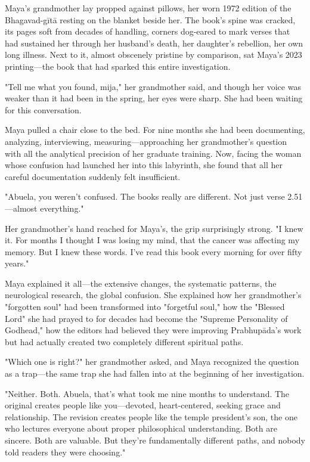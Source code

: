\documentclass[12pt,twoside]{book}
\begin{document}
Maya's grandmother lay propped against pillows, her worn 1972 edition of the Bhagavad-gītā resting on the blanket beside her. The book's spine was cracked, its pages soft from decades of handling, corners dog-eared to mark verses that had sustained her through her husband's death, her daughter's rebellion, her own long illness. Next to it, almost obscenely pristine by comparison, sat Maya's 2023 printing—the book that had sparked this entire investigation.

"Tell me what you found, mija," her grandmother said, and though her voice was weaker than it had been in the spring, her eyes were sharp. She had been waiting for this conversation.

Maya pulled a chair close to the bed. For nine months she had been documenting, analyzing, interviewing, measuring—approaching her grandmother's question with all the analytical precision of her graduate training. Now, facing the woman whose confusion had launched her into this labyrinth, she found that all her careful documentation suddenly felt insufficient.

"Abuela, you weren't confused. The books really are different. Not just verse 2.51—almost everything."

Her grandmother's hand reached for Maya's, the grip surprisingly strong. "I knew it. For months I thought I was losing my mind, that the cancer was affecting my memory. But I knew these words. I've read this book every morning for over fifty years."

Maya explained it all—the extensive changes, the systematic patterns, the neurological research, the global confusion. She explained how her grandmother's "forgotten soul" had been transformed into "forgetful soul," how the "Blessed Lord" she had prayed to for decades had become the "Supreme Personality of Godhead," how the editors had believed they were improving Prabhupāda's work but had actually created two completely different spiritual paths.

"Which one is right?" her grandmother asked, and Maya recognized the question as a trap—the same trap she had fallen into at the beginning of her investigation.

"Neither. Both. Abuela, that's what took me nine months to understand. The original creates people like you—devoted, heart-centered, seeking grace and relationship. The revision creates people like the temple president's son, the one who lectures everyone about proper philosophical understanding. Both are sincere. Both are valuable. But they're fundamentally different paths, and nobody told readers they were choosing."
\end{document}
